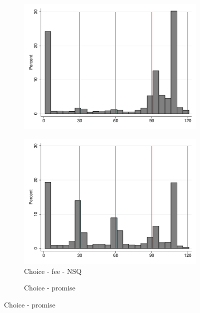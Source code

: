 \documentclass[11pt]{article}
\begin{document}
\begin{figure}[H]
\begin{center}
\begin{subfigure}{.31\textwidth}
        \includegraphics[width=\textwidth]{Figuras/hist_payments_pro_6.pdf}
    \end{subfigure}    
     \begin{subfigure}{.31\textwidth}
    \caption{Choice - fee - NSQ}
        \centering
        \includegraphics[width=\textwidth]{Figuras/hist_payments_pro_7.pdf}
    \end{subfigure}    
     \begin{subfigure}{.31\textwidth}
    \caption{Choice - promise}
        \centering

\end{subfigure}
\end{center}
\end{figure}
\end{document}
